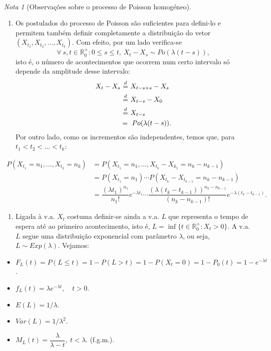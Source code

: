 \documentclass[
  11pt,
  a4paper,
]{book}
\providecommand{\tightlist}{%
  \setlength{\itemsep}{0pt}\setlength{\parskip}{0pt}}
\theoremstyle{definition}
\theoremstyle{definition}
\theoremstyle{definition}
\theoremstyle{definition}
\theoremstyle{remark}
\newtheorem*{remark}{Nota }
\begin{document}
\(\,\)

\begin{remark}[Observações sobre o processo de Poisson homogéneo]
\leavevmode

\begin{enumerate}
\def\labelenumi{\arabic{enumi}.}
\tightlist
\item
  Os postulados do processo de Poisson são suficientes para defini-lo e permitem também definir completamente a distribuição do vetor \((X_{t_1},X_{t_2},\dots, X_{t_k})\). Com efeito,
  por um lado verifica-se
  \[\forall ~s,t \in \mathbb{R}_0^+: 0 \leq s \leq t, ~X_t-X_s \sim Po(\lambda(t-s)),\]
  isto é, o número de acontecimentos que ocorrem num certo intervalo só depende da amplitude desse intervalo:
  \begin{align*}
  X_t-X_s & ~ {\buildrel d \over =} ~ X_{t-s+s}-X_s\\
       & ~ {\buildrel d \over =} ~  X_{t-s}-X_0\\
       & ~ {\buildrel d \over =} ~  X_{t-s}\\
       & = ~ Po(\lambda(t-s)).
  \end{align*}
  Por outro lado, como os incrementos são independentes, temos que, para \(t_1 < t_2 < \dots < t_k\):
\end{enumerate}

\begin{align*}
P(X_{t_1}=n_1, \dots, X_{t_k}=n_k) & =  P(X_{t_1}=n_1, \dots, X_{t_k}-X_{k_1}=n_k-n_{k-1})\\
        & =  P(X_{t_1}=n_1) \cdots P(X_{t_k}-X_{t_{k-1}}=n_k-n_{k-1})\\
        & =  \dfrac{(\lambda t_1)^{n_1}}{n_1!} e^{-\lambda t_1} \cdots \dfrac{(\lambda(t_k-t_{k-1}))^{n_k-n_{k-1}}}{(n_k-n_{k-1})!} e^{-\lambda(t_k-t_{k-1})}.
\end{align*}

\begin{enumerate}
\def\labelenumi{\arabic{enumi}.}
\setcounter{enumi}{1}
\tightlist
\item
  Ligada à v.a. \(X_t\) costuma definir-se ainda a v.a. \(L\) que representa o tempo de espera até ao primeiro acontecimento, isto é, \(L=\inf\{t \in \mathbb{R}_0^+: X_t>0\}\). A v.a. \(L\) segue uma distribuição exponencial com parâmetro \(\lambda\), ou seja, \(L \sim Exp(\lambda)\). Vejamos:
\end{enumerate}

\begin{itemize}
\tightlist
\item
  \(F_L(t)=P(L \leq t)=1-P(L>t)=1-P(X_t=0)=1-P_0(t)=1-e^{-\lambda t}\).
\item
  \(f_L(t)=\lambda e^{-\lambda t}, \quad t>0.\)
\item
  \(E(L)=1/\lambda\).
\item
  \(Var(L)=1/\lambda^2\).
\item
  \(M_L(t)=\dfrac{\lambda}{\lambda-t}, ~t< \lambda\). (f.g.m.).
\end{itemize}


\end{remark}
\end{document}
